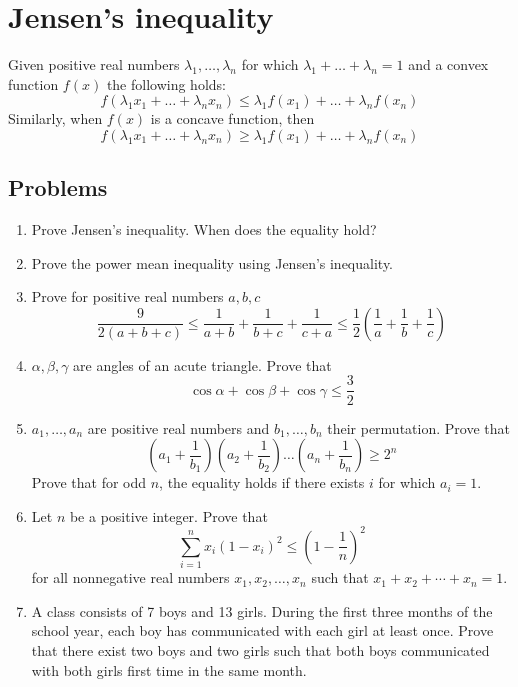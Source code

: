 \documentclass{article}
\begin{document}
\section*{Jensen's inequality}
Given positive real numbers $\lambda_1,\hdots,\lambda_n$ for which $\lambda_1+\hdots+\lambda_n=1$  and a convex function $f(x)$ the following holds:
$$f(\lambda_1 x_1 + \hdots + \lambda_n x_n) \leq \lambda_1 f(x_1) + \hdots + \lambda_n f(x_n)$$
Similarly, when $f(x)$ is a concave function, then 
$$f(\lambda_1 x_1 + \hdots + \lambda_n x_n) \geq \lambda_1 f(x_1) + \hdots + \lambda_n f(x_n)$$

\subsection*{Problems}
\begin{enumerate}
	\item
	Prove Jensen's inequality. When does the equality hold?
	
	\item 
	Prove the power mean inequality using Jensen's inequality.
	
	\item %
	Prove for positive real numbers $a,b,c$
	$$\frac{9}{2(a+b+c)} \leq \frac{1}{a+b} + \frac{1}{b+c} + \frac{1}{c+a} \leq \frac{1}{2} \left( \frac{1}{a} + \frac{1}{b} + \frac{1}{c} \right) $$
	
	\item %
	$\alpha,\beta,\gamma$ are angles of an acute triangle. Prove that
	$$\cos \alpha + \cos \beta + \cos \gamma \leq \frac{3}{2}$$
	
	\item %
	$a_1,\hdots,a_n$ are positive real numbers and $b_1, \hdots, b_n$ their permutation. Prove that
	$$\left( a_1 + \frac{1}{b_1} \right) 
	\left( a_2 + \frac{1}{b_2} \right) 
	\hdots
	\left( a_n + \frac{1}{b_n} \right) 
	\geq 2^n
	$$
	Prove that for odd $n$, the equality holds if there exists $i$ for which $a_i=1$.
	
	\item %
	Let $n$ be a positive  integer. Prove that
	\[
	\sum_{i=1}^{n}x_i(1-x_i)^2 \leq \left(1-\frac{1}{n}\right)^2
	\]
	for all nonnegative real numbers $x_1,x_2,\ldots,x_n$ such that $x_1+x_2+\cdots+x_n=1$.
	
	\item %
	A class consists of 7 boys and 13 girls. During the first three months of the school year, each boy has communicated with each girl at least once. Prove that there exist two boys and two girls such that both boys communicated with both girls first time in the same month.
	
\end{enumerate}
\end{document}

